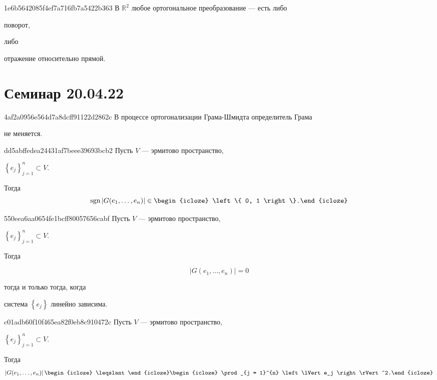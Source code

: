 \begin{note}{1e6b5642085f4ef7a716fb7a5422b363}
    В \({ \mathbb R^2 }\) любое ортогональное преобразование --- есть либо \begin{icloze}{1}поворот,\end{icloze} либо \begin{icloze}{2}отражение относительно прямой.\end{icloze}
\end{note}

\section{Семинар 20.04.22}
\begin{note}{4af2a0956e564d7a8dcff91122d2862c}
    В процессе ортогонализации Грама-Шмидта определитель Грама \begin{icloze}{1}не меняется.\end{icloze}
\end{note}

\begin{note}{dd5abffedea24431af7beee39693bcb2}
    Пусть \({ V }\) --- эрмитово пространство, \begin{icloze}{2}\({ \left\{ e_j \right\}_{j = 1}^{n} \subset V }\).\end{icloze}
    Тогда
    \[
        \operatorname{sgn} \left\lvert G(e_1, \ldots, e_n) \right\rvert \in \begin{icloze}{1}\left\{ 0, 1 \right\}.\end{icloze}
    \]
\end{note}

\begin{note}{550eea6aa0654fe1bcff80057656cabf}
    Пусть \({ V }\) --- эрмитово пространство, \begin{icloze}{4}\({ \left\{ e_j \right\}_{j = 1}^{n} \subset V }\).\end{icloze}
    Тогда \begin{icloze}{2}
        \[
            \left\lvert G(e_1, \ldots, e_n) \right\rvert = 0
        \]
    \end{icloze} \begin{icloze}{3}тогда и только тогда, когда\end{icloze} \begin{icloze}{1}система \({ \left\{ e_j \right\} }\) линейно зависима.\end{icloze}
\end{note}

\begin{note}{c01adb60f10f465ea82f0eb8c910472c}
    Пусть \({ V }\) --- эрмитово пространство, \begin{icloze}{3}\({ \left\{ e_j \right\}_{j = 1}^{n} \subset V }\).\end{icloze}
    Тогда
    \[
        \left\lvert G(e_1, \ldots, e_n) \right\rvert \begin{icloze}{2}\leqslant\end{icloze} \begin{icloze}{1}\prod_{j = 1}^{n} \left\lVert e_j \right\rVert^2.\end{icloze}
    \]
\end{note}

